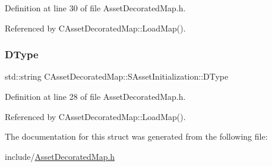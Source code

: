 Definition at line 30 of file Asset\+Decorated\+Map.\+h.



Referenced by C\+Asset\+Decorated\+Map\+::\+Load\+Map().

\hypertarget{structCAssetDecoratedMap_1_1SAssetInitialization_acc1ab65366ed9e00080b71c541f3b72d}{}\label{structCAssetDecoratedMap_1_1SAssetInitialization_acc1ab65366ed9e00080b71c541f3b72d} 
\subsubsection{\texorpdfstring{D\+Type}{DType}}
{\footnotesize\ttfamily std\+::string C\+Asset\+Decorated\+Map\+::\+S\+Asset\+Initialization\+::\+D\+Type}



Definition at line 28 of file Asset\+Decorated\+Map.\+h.



Referenced by C\+Asset\+Decorated\+Map\+::\+Load\+Map().



The documentation for this struct was generated from the following file\+:\begin{DoxyCompactItemize}
\item 
include/\hyperlink{AssetDecoratedMap_8h}{Asset\+Decorated\+Map.\+h}\end{DoxyCompactItemize}
